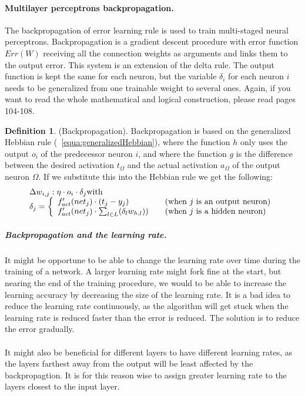 \documentclass[pdftex,a4paper,12pt,twoside]{report}
\theoremstyle{plain} \newtheorem{theorem}{Theorem} \newtheorem{proposition}{Proposition} \newtheorem{lemma}{Lemma} \newtheorem*{corollary}{Corollary}
\theoremstyle{definition} \newtheorem{definition}{Definition} \newtheorem{conjecture}{Conjecture} \newtheorem*{example}{Example} \newtheorem{algorithm}{Algorithm}
\theoremstyle{remark} \newtheorem*{remark}{Remark} \newtheorem*{note}{Note} \newtheorem{case}{Case}
\begin{document}
\paragraph{Multilayer perceptrons backpropagation.}
The backpropagation of error learning rule is used to train multi-staged neural perceptrons. Backpropagation is a gradient descent procedure with error function $Err(W)$ receiving all the connection weights as arguments and links them to the output error. This system is an extension of the delta rule. The output function is kept the same for each neuron, but the variable $\delta_i$ for each neuron $i$ needs to be generalized from one trainable weight to several ones. Again, if you want to read the whole mathematical and logical construction, please read \citep{Kriesel2013} pages 104-108.
\begin{definition}
(Backpropagation). Backpropagation is based on the generalized Hebbian rule (~\ref{equa:generalizedHebbian}), where the function $h$ only uses the output $o_i$ of the predecessor neuron $i$, and where the function $g$ is the difference between the desired activation $t_\Omega$ and the actual activation $a_\Omega$ of the output neuron $\Omega$. If we substitute this into the Hebbian rule we get the following:
\begin{equation}
\begin{array}{l l}
\Delta w_{i,j} : \eta \cdot o_i \cdot \delta_j \text{with}\\
\delta_j = \left\{
	\begin{array}{l l}
    f'_{act}(net_j) \cdot (t_j - y_j) & \quad \text{(when $j$ is an output neuron)}\\
    f'_{act}(net_j) \cdot \sum_{l \in L}(\delta_lw_{h,l})) & \quad \text{(when $j$ is a hidden neuron)}
  \end{array} \right.
\end{array}
\end{equation}
\end{definition}
\subparagraph{Backpropagation and the learning rate.}
It might be opportune to be able to change the learning rate over time during the training of a network. A larger learning rate might fork fine at the start, but nearing the end of the training procedure, we would to be able to increase the learning accuracy by decreasing the size of the learning rate. It is a bad idea to reduce the learning rate continuously, as the algorithm will get stuck when the learning rate is reduced faster than the error is reduced. The solution is to reduce the error gradually.\\\\It might also be beneficial for different layers to have different learning rates, as the layers farthest away from the output will be least affected by the backpropagtion. It is for this reason wise to assign greater learning rate to the layers closest to the input layer.
\end{document}
